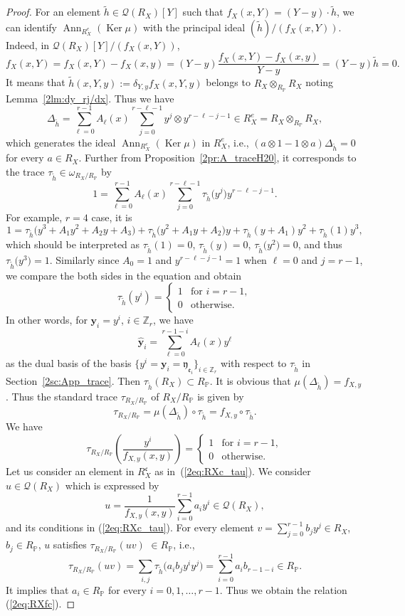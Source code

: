 \documentclass[pdftex]{sigma}
\def\ZZ{{\mathbb Z}}
\def\PP{{\mathbb P}}
\def\bby{{\mathbf y}}
\def\cQ{{\mathcal Q}}
\def\fc{{\mathfrak c}}
\def\fe{{\mathfrak e}}
\def\fy{{\mathfrak y}}
\def\th{{\widetilde h}}
\def\hby{\widehat {{\mathbf y}}}
\def\Ker{\operatorname{Ker}}
\def\Ann{\operatorname{Ann}}
\numberwithin{equation}{section}
\begin{document}
\begin{proof}
For an element $\th \in \cQ(R_X)[Y]$ such that $f_X(x,Y)=(Y-y) \cdot \th$,
we can identify $\Ann_{R_X^e}(\Ker \mu)$ with the principal ideal $(\th)/(f_X(x,Y))$.
Indeed, in $\cQ(R_X)[Y]/(f_X(x,Y))$,
\[
f_X(x,Y) = f_X(x,Y)-f_X(x,y) = (Y-y)\frac{f_X(x,Y)-f_X(x,y)}{Y-y}=(Y-y)\th=0.
\]
It means that $\th(x,Y,y):=\delta_{Y,y} f_X(x,Y,y)$ belongs to $R_X\otimes_{R_\PP} R_X$ noting Lemma~\ref{2lm:dy_rj/dx}.
Thus we have
\[
\Delta_{\th}=\sum_{\ell=0}^{r-1}A_\ell(x)\sum_{j=0}^{r-\ell-1}
y^{j}\otimes y^{r-\ell-j-1} \in R_X^e=R_X \otimes_{R_\PP} R_X,
\]
which generates the ideal $\Ann_{R_X^e}(\Ker \mu)$ in $R_X^e$, i.e.,
$(a\otimes 1-1\otimes a) \Delta_{\th}=0$ for every $a\in R_X$.
Further from Proposition~\ref{2pr:A_traceH20}, it corresponds to the trace $\tau_\th\in \omega_{R_X/R_\PP}$ by
\[
1=\sum_{\ell=0}^{r-1}A_\ell(x)
\sum_{j=0}^{r-\ell-1}\tau_\th\big(y^{j}\big)y^{r-\ell-j-1}.
\]
For example, $r=4$ case, it is
\[
1=\tau_\th\big(y^3 + A_1 y^2 + A_2 y+ A_3\big) +
\tau_\th\big(y^2 + A_1 y + A_2\big)y +
\tau_\th(y + A_1)y^2+\tau_\th(1)y^3,
\]
which should be interpreted as $\tau_\th(1)=0$, $\tau_\th(y)=0$, $\tau_\th\big(y^2\big)=0$, and thus $\tau_\th\big(y^3\big)=1$.
Similarly since $A_0=1$ and $y^{r-\ell-j-1}=1$ when $\ell=0$ and $j=r-1$, we compare the both sides in the equation and obtain
\[
\tau_\th(y^i) =
\begin{cases}
1 & \text{for } i=r-1,\\
0 & \text{otherwise}.
\end{cases}
\]
In other words, for $\bby_i = y^i$, $i\in \ZZ_r$, we have
\[
\hby_i = \sum_{\ell=0}^{r-1-i}A_\ell(x)y^{\ell}
\]
as the dual basis of the basis $\{y^i =\bby_i = \fy_{\fe_i}\}_{i\in \ZZ_r}$ with respect to $\tau_\th$ in Section~\ref{2sc:App_trace}.
Then $\tau_\th(R_X) \subset R_\PP$. It is obvious that $\mu(\Delta_{\th})= f_{X,y}$.
Thus the standard trace $\tau_{R_X/R_\PP}$ of $R_X/R_\PP$ is given by
\[
\tau_{R_X/R_\PP}=\mu(\Delta_\th)\circ \tau_\th=
 f_{X,y}\circ \tau_\th.
\]
We have
\[
\tau_{R_X/R_\PP}
\left(\frac{y^i}{ f_{X,y}(x,y)}\right)
= \begin{cases}
1 & \text{for } i=r-1,\\
0 & \text{otherwise}.
\end{cases}
\]
Let us consider an element in $R_{X}^{\fc}$ as in~(\ref{2eq:RXc_tau}).
We consider $u \in \cQ(R_X)$ which is expressed by
\[
u = \frac{1}{f_{X,y}(x,y)} \sum_{i=0}^{r-1} a_i y^i \in \cQ(R_X),
\]
and its conditions in (\ref{2eq:RXc_tau}).
For every element $v = \sum_{j=0}^{r-1} b_j y^j \in R_X$, $b_j \in R_\PP$, $u$ satisfies $\tau_{R_X/R_\PP}(u v)$ $ \in R_\PP$, i.e.,
\[
\tau_{R_X/R_\PP}(u v)= \sum_{i,j} \tau_\th\big(a_i b_j y^i y^j\big)= \sum_{i=0}^{r-1} a_i b_{r-1-i}\in R_\PP.
\]
It implies that $a_i \in R_\PP$ for every $i=0, 1, \dots, r-1$.
Thus we obtain the relation (\ref{2eq:RXfc}).
\end{proof}
\end{document}
